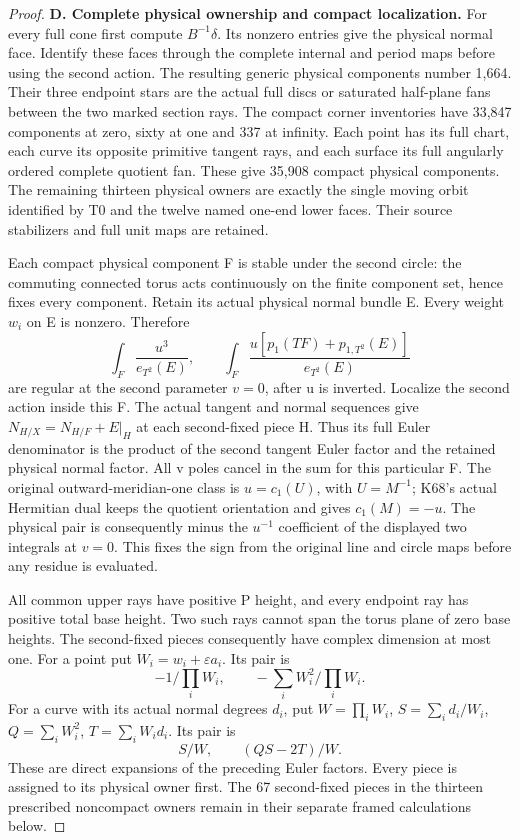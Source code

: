\begin{proof}
\medskip\noindent\textbf{D. Complete physical ownership and compact localization.}
For every full cone first compute \(B^{-1}\delta\).  Its nonzero entries
give the physical normal face.  Identify these faces through the complete
internal and period maps before using the second action.  The resulting
generic physical components number 1,664.  Their three endpoint stars are
the actual full discs or saturated half-plane fans between the two marked
section rays.  The compact corner inventories have 33,847 components at
zero, sixty at one and 337 at infinity.  Each point has its full chart,
each curve its opposite primitive tangent rays, and each surface its full
angularly ordered complete quotient fan.  These give 35,908 compact
physical components.  The remaining thirteen physical owners are exactly
the single moving orbit identified by T0 and the twelve named one-end
lower faces.  Their source stabilizers and full unit maps are retained.

Each compact physical component F is stable under the second circle:
the commuting connected torus acts continuously on the finite component
set, hence fixes every component.  Retain its actual physical normal
bundle E.  Every weight \(w_i\) on E is nonzero.  Therefore
\[
\int_F\frac{u^3}{e_{T^2}(E)},\qquad
\int_F\frac{u[p_1(TF)+p_{1,T^2}(E)]}{e_{T^2}(E)}
\]
are regular at the second parameter \(v=0\), after u is inverted.
Localize the second action inside this F.  The actual tangent and normal
sequences give
\(N_{H/X}=N_{H/F}+E|_H\) at each second-fixed piece H.  Thus its full
Euler denominator is the product of the second tangent Euler factor and
the retained physical normal factor.  All v poles cancel in the sum for
this particular F.  The original outward-meridian-one class is
\(u=c_1(U)\), with \(U=M^{-1}\); K68's actual Hermitian dual keeps
the quotient orientation and gives \(c_1(M)=-u\).  The physical pair
is consequently minus the \(u^{-1}\) coefficient of the displayed
two integrals at \(v=0\).  This fixes the sign from the original line
and circle maps before any residue is evaluated.

All common upper rays have positive P height, and every endpoint ray has
positive total base height.  Two such rays cannot span the torus plane
of zero base heights.  The second-fixed pieces consequently have complex
dimension at most one.  For a point put
\(W_i=w_i+\varepsilon a_i\).  Its pair is
\[
-1/\prod_iW_i,\qquad-\sum_iW_i^2/\prod_iW_i.
\]
For a curve with its actual normal degrees \(d_i\), put
\(W=\prod_iW_i\), \(S=\sum_i d_i/W_i\),
\(Q=\sum_iW_i^2\), \(T=\sum_iW_id_i\).  Its pair is
\[
S/W,\qquad(QS-2T)/W.
\]
These are direct expansions of the preceding Euler factors.  Every
piece is assigned to its physical owner first.  The 67 second-fixed
pieces in the thirteen prescribed noncompact owners remain in their
separate framed calculations below.


\end{proof}
